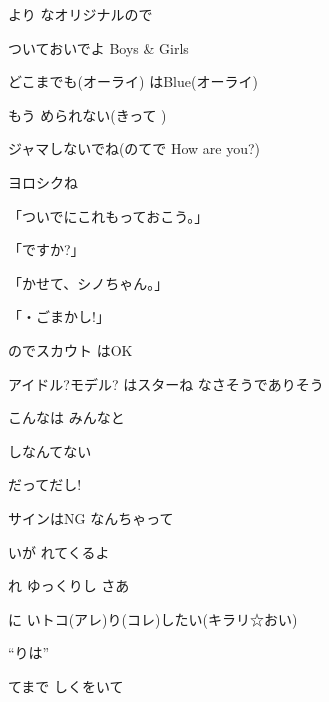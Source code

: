 \documentclass[14pt]{ltjsarticle}
\begin{document}
{  より なオリジナルので
  \jisho{}

  ついておいでよ Boys \& Girls
  \jisho{}

  どこまでも(オーライ) はBlue(オーライ)
  \jisho{}

  もう められない(きって )
  \jisho{}

  ジャマしないでね(のてで How are you?)
  \jisho{}

  ヨロシクね
  \jisho{}

\item
  \mbox「ついでにこれもっておこう。」
  \jisho{}

  「ですか?」
  \jisho{}

  「かせて、シノちゃん。」
  \jisho{}

  「・ごまかし!」
  \jisho{}

\item
  のでスカウト はOK
  \jisho{}

  アイドル?モデル? はスターね なさそうでありそう
  \jisho{}

  こんなは みんなと
  \jisho{}

  しなんてない
  \jisho{}

  だってだし!
  \jisho{}

    サインはNG なんちゃって
  \jisho{}

\item
  いが れてくるよ
  \jisho{}

  れ ゆっくりし さあ
  \jisho{}

  に いトコ(アレ)り(コレ)したい(キラリ☆おい)
  \jisho{}

\item
  ``りは''
  \jisho{}

\item
  てまで しくをいて
  \jisho{}

}
\end{document}
